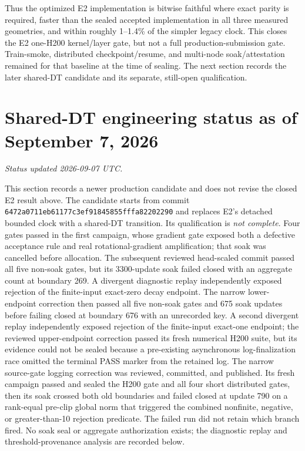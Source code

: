 \documentclass[11pt]{article}
\begin{document}
Thus the optimized E2 implementation is bitwise faithful where exact parity is required, faster
than the sealed accepted implementation in all three measured geometries, and within roughly
1--1.4\% of the simpler legacy clock.  This closes the E2 one-H200 kernel/layer gate, but not a full
production-submission gate.  Train-smoke, distributed checkpoint/resume, and multi-node
soak/attestation remained for that baseline at the time of sealing.  The next section records the
later shared-DT candidate and its separate, still-open qualification.

\section{Shared-DT engineering status as of September 7, 2026}
\label{sec:shared-dt-status}

\noindent\textit{Status updated 2026-09-07 UTC.}

This section records a newer production candidate and does not revise the closed E2 result above.
The candidate starts from commit
\texttt{6472a0711eb61177c3ef91845855fffa82202290} and replaces E2's detached bounded clock with a
shared-DT transition.  Its qualification is \emph{not complete}.  Four gates passed in the first
campaign, whose gradient gate exposed both a defective acceptance rule and real rotational-gradient
amplification; that soak was cancelled before allocation.  The subsequent reviewed head-scaled
commit passed all five non-soak gates, but its 3300-update soak failed closed with an aggregate
count at boundary 269.  A divergent diagnostic replay independently exposed rejection of the
finite-input exact-zero decay endpoint.  The narrow lower-endpoint correction then passed all five
non-soak gates and 675 soak updates before failing closed at boundary 676 with an unrecorded key.
A second divergent replay independently exposed rejection of the finite-input exact-one endpoint;
the reviewed upper-endpoint correction passed its fresh numerical H200 suite, but its evidence
could not be sealed because a pre-existing asynchronous log-finalization race omitted the terminal
PASS marker from the retained log.  The narrow source-gate logging correction was reviewed,
committed, and published.  Its fresh campaign passed and sealed the H200 gate and all four short
distributed gates, then its soak crossed both old boundaries and failed closed at update 790 on a
rank-equal pre-clip global norm that triggered the combined nonfinite, negative, or greater-than-10
rejection predicate.  The failed run did not retain which branch fired.  No soak seal or aggregate
authorization exists; the diagnostic replay and threshold-provenance analysis are recorded below.
\end{document}
